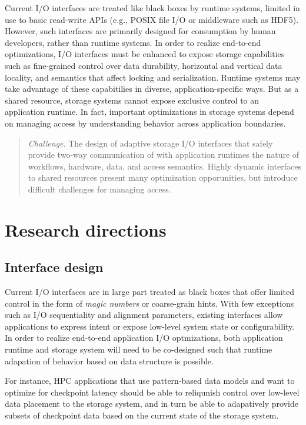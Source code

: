 \documentclass{sig-alternate-05-2015}
\begin{document}
Current I/O interfaces are treated like black boxes by runtime systems, limited
in use to basic read-write APIs (e.g., POSIX file I/O or middleware such as
HDF5). However, such interfaces are primarily designed for consumption by human
developers, rather than runtime systems.  In order to realize end-to-end
optimizations, I/O interfaces must be enhanced to expose storage capabilities
such as fine-grained control over data durability, horizontal and vertical data
locality, and semantics that affect locking and serialization. Runtime systems
may take advantage of these capabitilies in diverse, application-specific ways.
But as a shared resource, storage systems cannot expose exclusive control to an
application runtime. In fact, important optimizations in storage systems depend
on managing access by understanding behavior across application boundaries.

\begin{quote}
  \emph{Challenge}. The design of adaptive storage I/O interfaces that safely
  provide two-way communication of with application runtimes the nature of
  workflows, hardware, data, and access semantics. Highly dynamic interfaces to shared resources
  present many optimization opporunities, but introduce difficult challenges for
  managing access.
\end{quote}

\section{Research directions}

\subsection{Interface design}

Current I/O interfaces are in large part treated as black boxes that offer
limited control in the form of \emph{magic numbers} or coarse-grain hints. With
few exceptions such as I/O sequentiality and alignment parameters, existing
interfaces allow applications to express intent or expose low-level system state
or configurability. In order to realize end-to-end application I/O optmizations,
both application runtime and storage system will need to be co-designed such that runtime
adapation of behavior based on data structure is possible.

For instance, HPC applications that use pattern-based data models and want to
optimize for checkpoint latency should be able to reliqunish control over low-level
data placement to the storage system, and in turn be able to adapatively provide
subsets of checkpoint data based on the current state of the storage system.
\end{document}
